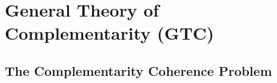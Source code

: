%
%

\chapter{General Theory of Complementarity (GTC)}
\label{app:gtc}

\begin{abstract}
The EBF framework employs complementarity ($\gamma$) at multiple levels: utility
dimensions, awareness components, interventions, welfare levels, segments, and
time periods. Without a unifying theory, these different $\gamma$ types could
produce contradictions. This appendix develops the \textbf{General Theory of
Complementarity (GTC)}, which: (1) defines a unified complementarity space,
(2) proves transmission theorems showing how $\gamma$ propagates across levels,
(3) derives consistency conditions that must hold, and (4) identifies legitimate
deviation mechanisms (crowding-out, attention competition, timing mismatch).
The GTC provides the mathematical foundation ensuring coherence across all
EBF components.
\end{abstract}

\section{The Complementarity Coherence Problem}
\label{sec:gtc-problem}

